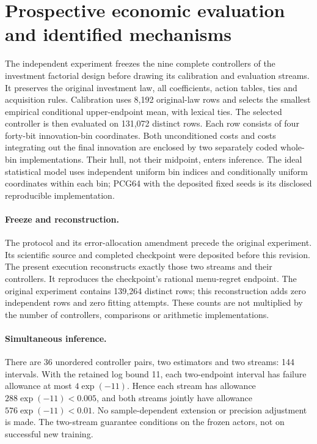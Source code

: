 \section{Prospective economic evaluation and identified mechanisms}\label{sec:study86}
The independent experiment freezes the nine complete controllers of the investment factorial design before drawing its calibration and evaluation streams. It preserves the original investment law, all coefficients, action tables, ties and acquisition rules. Calibration uses 8,192 original-law rows and selects the smallest empirical conditional upper-endpoint mean, with lexical ties. The selected controller is then evaluated on 131,072 distinct rows. Each row consists of four forty-bit innovation-bin coordinates. Both unconditioned costs and costs integrating out the final innovation are enclosed by two separately coded whole-bin implementations. Their hull, not their midpoint, enters inference. The ideal statistical model uses independent uniform bin indices and conditionally uniform coordinates within each bin; PCG64 with the deposited fixed seeds is its disclosed reproducible implementation.

\paragraph{Freeze and reconstruction.}
The protocol and its error-allocation amendment precede the original experiment. Its scientific source and completed checkpoint were deposited before this revision. The present execution reconstructs exactly those two streams and their controllers. It reproduces the checkpoint's rational menu-regret endpoint. The original experiment contains 139,264 distinct rows; this reconstruction adds zero independent rows and zero fitting attempts. These counts are not multiplied by the number of controllers, comparisons or arithmetic implementations.

\paragraph{Simultaneous inference.}
There are 36 unordered controller pairs, two estimators and two streams: 144 intervals. With the retained log bound 11, each two-endpoint interval has failure allowance at most $4\exp(-11)$. Hence each stream has allowance $288\exp(-11)<0.005$, and both streams jointly have allowance $576\exp(-11)<0.01$. No sample-dependent extension or precision adjustment is made. The two-stream guarantee conditions on the frozen actors, not on successful new training.

